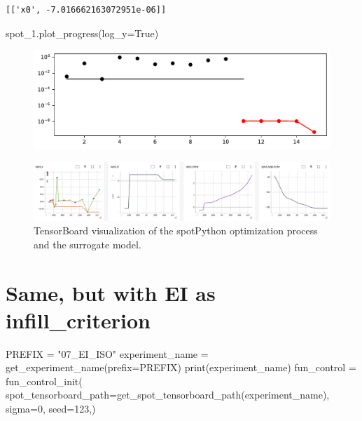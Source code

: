\documentclass[
  letterpaper,
  DIV=11,
  numbers=noendperiod]{scrreprt}
\newenvironment{Shaded}{\begin{snugshade}}{\end{snugshade}}
\newcommand{\BuiltInTok}[1]{\textcolor[rgb]{0.00,0.23,0.31}{#1}}
\newcommand{\DecValTok}[1]{\textcolor[rgb]{0.68,0.00,0.00}{#1}}
\newcommand{\NormalTok}[1]{\textcolor[rgb]{0.00,0.23,0.31}{#1}}
\newcommand{\OperatorTok}[1]{\textcolor[rgb]{0.37,0.37,0.37}{#1}}
\newcommand{\StringTok}[1]{\textcolor[rgb]{0.13,0.47,0.30}{#1}}
\newcommand{\VariableTok}[1]{\textcolor[rgb]{0.07,0.07,0.07}{#1}}
\begin{document}
\begin{verbatim}
[['x0', -7.016662163072951e-06]]
\end{verbatim}

\begin{Shaded}
\begin{Highlighting}[]
\NormalTok{spot\_1.plot\_progress(log\_y}\OperatorTok{=}\VariableTok{True}\NormalTok{)}
\end{Highlighting}
\end{Shaded}

\begin{figure}[H]

{\centering \includegraphics{012_num_spot_ei_files/figure-pdf/cell-8-output-1.pdf}

}

\end{figure}

\begin{figure}

{\centering \includegraphics[width=1\textwidth,height=\textheight]{figures_static/07_tensorboard_Y.png}

}

\caption{TensorBoard visualization of the spotPython optimization
process and the surrogate model.}

\end{figure}

\hypertarget{same-but-with-ei-as-infill_criterion}{%
\section{Same, but with EI as
infill\_criterion}\label{same-but-with-ei-as-infill_criterion}}

\begin{Shaded}
\begin{Highlighting}[]
\NormalTok{PREFIX }\OperatorTok{=} \StringTok{"07\_EI\_ISO"}
\NormalTok{experiment\_name }\OperatorTok{=}\NormalTok{ get\_experiment\_name(prefix}\OperatorTok{=}\NormalTok{PREFIX)}
\BuiltInTok{print}\NormalTok{(experiment\_name)}
\NormalTok{fun\_control }\OperatorTok{=}\NormalTok{ fun\_control\_init(}
\NormalTok{    spot\_tensorboard\_path}\OperatorTok{=}\NormalTok{get\_spot\_tensorboard\_path(experiment\_name),}
\NormalTok{    sigma}\OperatorTok{=}\DecValTok{0}\NormalTok{,}
\NormalTok{    seed}\OperatorTok{=}\DecValTok{123}\NormalTok{,)}
\end{Highlighting}
\end{Shaded}
\end{document}
